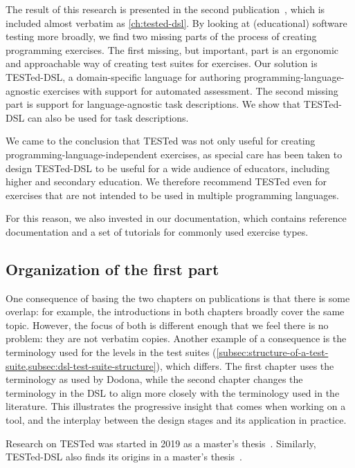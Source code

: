 \documentclass[../main]{subfiles}
\begin{document}
The result of this research is presented in the second publication~\autocite{strijbolTESTedDSLDomainspecificLanguage2024}, which is included almost verbatim as \cref{ch:tested-dsl}.
By looking at (educational) software testing more broadly, we find two missing parts of the process of creating programming exercises.
The first missing, but important, part is an ergonomic and approachable way of creating test suites for exercises.
Our solution is TESTed-DSL, a domain-specific language for authoring programming-language-agnostic exercises with support for automated assessment.
The second missing part is support for language-agnostic task descriptions.
We show that TESTed-DSL can also be used for task descriptions.

We came to the conclusion that TESTed was not only useful for creating programming-language-independent exercises, as special care has been taken to design TESTed-DSL to be useful for a wide audience of educators, including higher and secondary education.
We therefore recommend TESTed even for exercises that are not intended to be used in multiple programming languages.

For this reason, we also invested in our documentation, which contains reference documentation and a set of tutorials for commonly used exercise types.

\subsection{Organization of the first part}\label{subsec:organization-of-the-first-part}

One consequence of basing the two chapters on publications is that there is some overlap: for example, the introductions in both chapters broadly cover the same topic.
However, the focus of both is different enough that we feel there is no problem: they are not verbatim copies.
Another example of a consequence is the terminology used for the levels in the test suites (\cref{subsec:structure-of-a-test-suite,subsec:dsl-test-suite-structure}), which differs.
The first chapter uses the terminology as used by Dodona, while the second chapter changes the terminology in the DSL to align more closely with the terminology used in the literature.
This illustrates the progressive insight that comes when working on a tool, and the interplay between the design stages and its application in practice.

Research on TESTed was started in 2019 as a master's thesis~\autocite{strijbolTESTedOneJudge2020}.
Similarly, TESTed-DSL also finds its origins in a master's thesis~\autocite{selsTESTedProgrammeertaalonafhankelijkTesten2021}.
\end{document}
